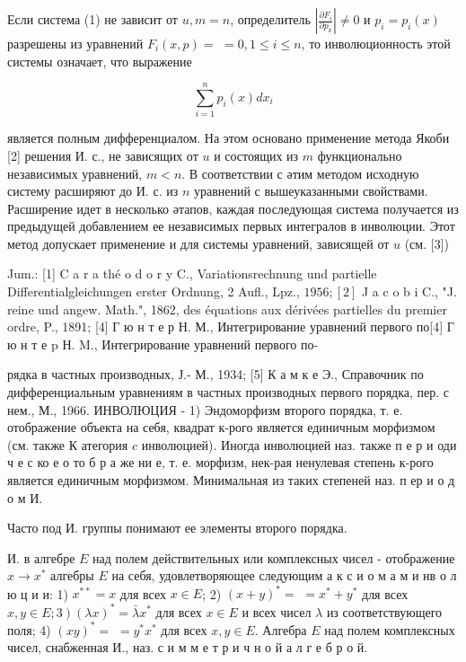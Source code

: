 \documentclass[10pt]{article}
\begin{document}
Если система (1) не зависит от $u, m=n$, определитель $\left|\frac{\partial F_{i}}{\partial p_{k}}\right| \neq 0$ и $p_{i}=p_{i}(x)$ разрешены из уравнений $F_{i}(x, p)=$ $=0,1 \leqslant i \leqslant n$, то инволюционность этой системы означает, что выражение



\[

\sum_{i=1}^{n} p_{i}(x) d x_{i}

\]



является полным дифференциалом. На этом основано применение метода Якоби [2] решения И. с., не зависящих от $u$ и состоящих из $m$ функционально независимых уравнений, $m<n$. В соответствии с әтим методом исходную систему расширяют до И. с. из $n$ уравнений с вышеуказанными свойствами. Расширение идет в несколько әтапов, каждая последующая система получается из предыдущей добавлением ее независимых первых интегралов в инволюции. Этот метод допускает применение и для системы уравнений, зависящей от $u$ (см. [3])



Jum.: [1] C a r a thé o d o r y C., Variationsrechnung und partielle Differentialgleichungen erster Ordnung, 2 Aufl., Lpz., $1956 ;[2]$ J a c o b $\mathrm{i}$ C., "J. reine und angew. Math.", 1862, des équations aux dérivées partielles du premier ordre, P., 1891; [4] Г ю н т е р Н. М., Интегрирование уравнений первого по[4] Г ю н т е p Н. M., Интегрирование уравнений первого по-

рядка в частных производных, Ј.- М., 1934; [5] К а м к е Э., Справочник по дифференциальным уравнениям в частных производных первого порядка, пер. с нем., М., 1966. ИНВОЛЮЦИЯ - 1) Эндоморфизм второго порядка, т. е. отображение объекта на себя, квадрат к-рого является единичным морфизмом (см. также К атегория $c$ инволюцией). Иногда инволюцией наз. также п е р и оди ч е с ко е о то б р а же ни е, т. е. морфизм, нек-рая ненулевая степень к-рого является единичным морфизмом. Минимальная из таких степеней наз. п ер и о д о м И.



Часто под И. группы понимают ее элементы второго порядка.



И. в алгебре $E$ над полем действительных или комплексных чисел - отображение $x \rightarrow x^{*}$ алгебры $E$ на себя, удовлетворяющее следующим а к с и о м а м и нв о л ю ц и и: 1) $x^{* *}=x$ для всех $x \in E$; 2) $(x+y)^{*}=$ $=x^{*}+y^{*}$ для всех $\left.x, y \in E ; 3\right)(\lambda x)^{*}=\bar{\lambda} x^{*}$ для всех $x \in E$ и всех чисел $\lambda$ из соответствующего поля; 4) $(x y)^{*}=$ $=y^{*} x^{*}$ для всех $x, y \in E$. Алгебра $E$ над полем комплексных чисел, снабженная И., наз. с и м м е т р и ч н о й а л г е б р о й.
\end{document}
